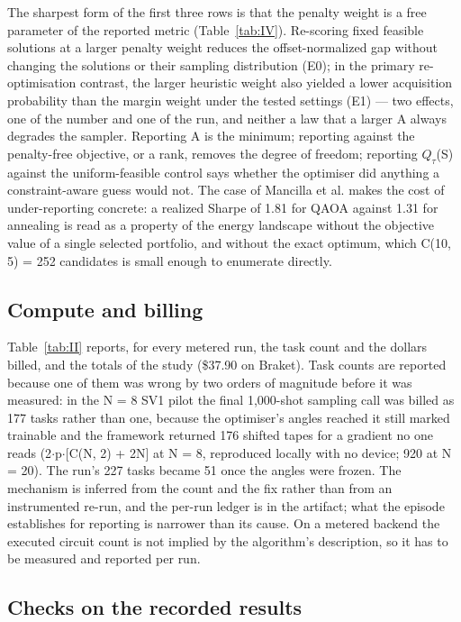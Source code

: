 \documentclass{ieeeaccess}
\begin{document}
The sharpest form of the first three rows is that the penalty weight is a free parameter of the reported metric (Table~\ref{tab:IV}). Re-scoring fixed feasible solutions at a larger penalty weight reduces the offset-normalized gap without changing the solutions or their sampling distribution (E0); in the primary re-optimisation contrast, the larger heuristic weight also yielded a lower acquisition probability than the margin weight under the tested settings (E1) --- two effects, one of the number and one of the run, and neither a law that a larger A always degrades the sampler. Reporting A is the minimum; reporting against the penalty-free objective, or a rank, removes the degree of freedom; reporting $Q_{\tau}$(S) against the uniform-feasible control says whether the optimiser did anything a constraint-aware guess would not. The case of Mancilla et al. \cite{ref24} makes the cost of under-reporting concrete: a realized Sharpe of 1.81 for QAOA against 1.31 for annealing is read as a property of the energy landscape without the objective value of a single selected portfolio, and without the exact optimum, which C(10, 5) = 252 candidates is small enough to enumerate directly.


\subsection{Compute and billing}


Table~\ref{tab:II} reports, for every metered run, the task count and the dollars billed, and the totals of the study (\$37.90 on Braket). Task counts are reported because one of them was wrong by two orders of magnitude before it was measured: in the N = 8 SV1 pilot the final 1,000-shot sampling call was billed as 177 tasks rather than one, because the optimiser's angles reached it still marked trainable and the framework returned 176 shifted tapes for a gradient no one reads (2$\cdot$p$\cdot$[C(N, 2) + 2N] at N = 8, reproduced locally with no device; 920 at N = 20). The run's 227 tasks became 51 once the angles were frozen. The mechanism is inferred from the count and the fix rather than from an instrumented re-run, and the per-run ledger is in the artifact; what the episode establishes for reporting is narrower than its cause. On a metered backend the executed circuit count is not implied by the algorithm's description, so it has to be measured and reported per run.


\subsection{Checks on the recorded results}
\end{document}
